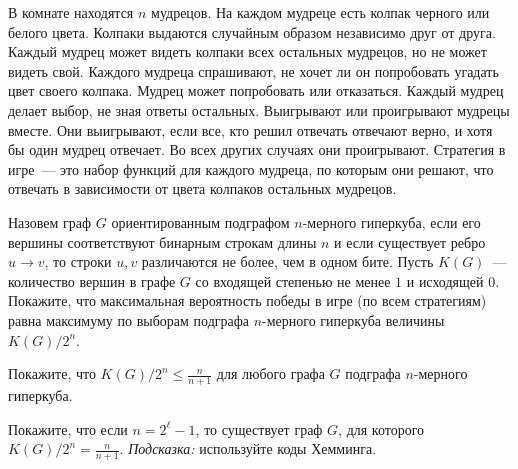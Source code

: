 В комнате находятся $n$ мудрецов. На каждом мудреце есть колпак черного или белого цвета. Колпаки
выдаются случайным образом независимо друг от друга. Каждый мудрец может видеть колпаки всех остальных
мудрецов, но не может видеть свой. Каждого мудреца спрашивают, не хочет ли он попробовать угадать цвет
своего колпака. Мудрец может попробовать или отказаться. Каждый мудрец делает выбор, не зная ответы
остальных. Выигрывают или проигрывают мудрецы вместе. Они выигрывают, если все, кто решил отвечать
отвечают верно, и хотя бы один мудрец отвечает. Во всех других случаях они проигрывают. Стратегия в
игре~--- это набор функций для каждого мудреца, по которым они решают, что отвечать в зависимости от
цвета колпаков остальных мудрецов.
\begin{enumcyr}
    \item Назовем граф $G$ ориентированным подграфом $n$-мерного гиперкуба, если его вершины
        соответствуют бинарным строкам длины $n$ и если существует ребро $u \rightarrow v$, то строки $u,
        v$ различаются не более, чем в одном бите. Пусть $K(G)$~--- количество вершин в графе $G$ со
        входящей степенью не менее $1$ и исходящей $0$. Покажите, что максимальная вероятность победы в
        игре (по всем стратегиям) равна максимуму по выборам подграфа $n$-мерного гиперкуба величины
        $K(G) / 2^n$.
    \item Покажите, что $K(G) / 2^n \le \frac{n}{n + 1}$ для любого графа $G$ подграфа $n$-мерного
        гиперкуба.
    \item Покажите, что если $n = 2^{\ell} - 1$, то существует граф $G$, для которого $K(G) / 2^n =
        \frac{n}{n + 1}$. \textit{Подсказка:} используйте коды Хемминга.
\end{enumcyr}